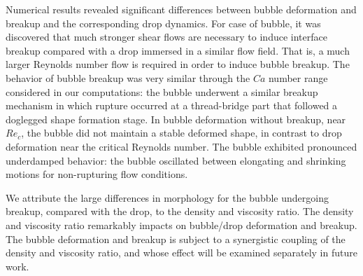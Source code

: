\documentclass[%
 reprint,
 showkeys,
 amsmath,amssymb,
 aps,
 prfluids,
 onecolumn
]{revtex4-2}
\begin{document}
Numerical results revealed significant differences between bubble deformation
and breakup and the corresponding drop dynamics.  For case of bubble, it was
discovered that much stronger shear flows are necessary to induce interface
breakup compared with a drop immersed in a similar flow field.  That is, a much
larger Reynolds number flow is required in order to induce bubble breakup.  The
behavior of bubble breakup was very similar through the $Ca$ number range
considered in our computations: the bubble underwent a similar breakup
mechanism in which rupture occurred at a thread-bridge part that followed a
doglegged shape formation stage.  In bubble deformation without breakup, near
$Re_{c}$, the bubble did not maintain a stable deformed shape, in contrast to
drop deformation near the critical Reynolds number.  The bubble exhibited
pronounced underdamped behavior: the bubble oscillated between elongating and
shrinking motions for non-rupturing flow conditions.

We attribute the large differences in morphology for the bubble undergoing
breakup, compared with the drop, to the density and viscosity ratio.  The
density and viscosity ratio remarkably impacts on bubble/drop deformation and
breakup.  The bubble deformation and breakup is subject to a synergistic
coupling of the density and viscosity ratio, and whose effect will be examined
separately in future work.




\end{document}
